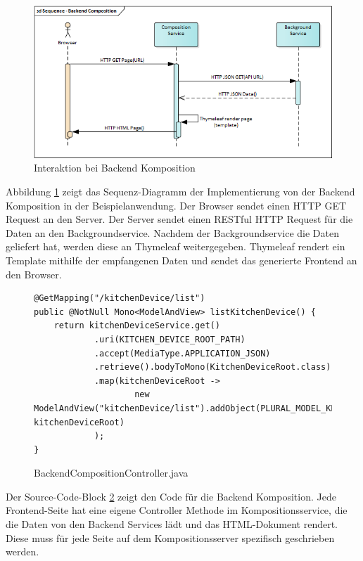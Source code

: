 \begin{figure}
    \centering
    \includegraphics[width=\textwidth]{sections/methology/assets/SequenceBackendComposition}
    \caption{Interaktion bei Backend Komposition}
    \label{fig:sections:methology:backendComposition:Sequence}
\end{figure}

Abbildung  \ref{fig:sections:methology:backendComposition:Sequence} zeigt das Sequenz-Diagramm der Implementierung von der Backend Komposition in der Beispielanwendung. Der Browser sendet einen HTTP GET Request an den Server. Der Server sendet einen \ac{REST}ful \ac{HTTP} Request für die Daten an den Backgroundservice. Nachdem der Backgroundservice die Daten geliefert hat, werden diese an Thymeleaf weitergegeben. Thymeleaf rendert ein Template mithilfe der empfangenen Daten und sendet das generierte Frontend an den Browser.

\begin{figure}
    \centering
\begin{lstlisting}
@GetMapping("/kitchenDevice/list")
public @NotNull Mono<ModelAndView> listKitchenDevice() {
    return kitchenDeviceService.get()
            .uri(KITCHEN_DEVICE_ROOT_PATH)
            .accept(MediaType.APPLICATION_JSON)
            .retrieve().bodyToMono(KitchenDeviceRoot.class)
            .map(kitchenDeviceRoot ->
                    new ModelAndView("kitchenDevice/list").addObject(PLURAL_MODEL_KEY, kitchenDeviceRoot)
            );
}
\end{lstlisting}
    \caption{BackendCompositionController.java}
    \label{fig:backendComposition:GETComposition}
\end{figure}

Der  Source-Code-Block \ref{fig:backendComposition:GETComposition} zeigt den Code für die Backend Komposition. Jede Frontend-Seite hat eine eigene Controller Methode im Kompositionsservice, die die Daten von den Backend Services lädt und das HTML-Dokument rendert. Diese muss für jede Seite auf dem Kompositionsserver spezifisch geschrieben werden.

